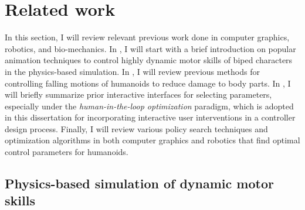 \chapter{Related work}

In this section, I will review relevant previous work done in 
computer graphics, robotics, and bio-mechanics.
In , I will start with a brief introduction on
popular animation techniques to control highly dynamic motor skills
of biped characters in the physics-based simulation.
In , I will review previous methods for controlling
falling motions of humanoids to reduce damage to body parts.
In , I will briefly summarize prior interactive
interfaces for selecting parameters, especially under the 
\emph{human-in-the-loop optimization} paradigm, which is
adopted in this dissertation for incorporating interactive user interventions
in a controller design process.
Finally, I will review various policy search techniques and optimization
algorithms in both computer graphics and robotics that find optimal
control parameters for humanoids.

\section{Physics-based simulation of dynamic motor skills}
\label{sec:related_dynamic}

